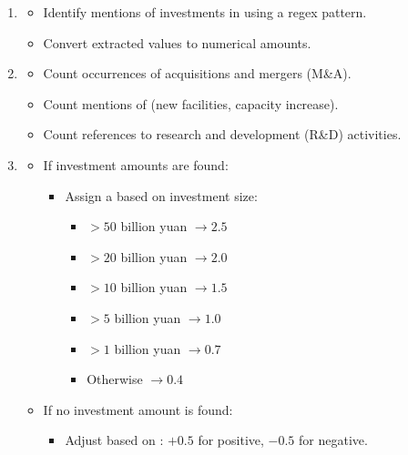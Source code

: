 \documentclass[3p,times,procedia]{elsarticle}
\begin{document}
\begin{enumerate}
    \item {}
    \begin{itemize}
        \item Identify mentions of investments in  using a regex pattern.
        \item Convert extracted values to numerical amounts.
    \end{itemize}

    \item {}
    \begin{itemize}
        \item Count occurrences of acquisitions and mergers (M\&A).
        \item Count mentions of  (new facilities, capacity increase).
        \item Count references to research and development (R\&D) activities.
    \end{itemize}

    \item {}
    \begin{itemize}
        \item If investment amounts are found:
        \begin{itemize}
            \item Assign a  based on investment size:
            \begin{itemize}
                \item $> 50$ billion yuan $\rightarrow 2.5$
                \item $> 20$ billion yuan $\rightarrow 2.0$
                \item $> 10$ billion yuan $\rightarrow 1.5$
                \item $> 5$ billion yuan $\rightarrow 1.0$
                \item $> 1$ billion yuan $\rightarrow 0.7$
                \item Otherwise $\rightarrow 0.4$
            \end{itemize}
        \end{itemize}
        \item If no investment amount is found:
        \begin{itemize}
            \item Adjust based on : $+0.5$ for positive, $-0.5$ for negative.
        \end{itemize}
    \end{itemize}


\end{enumerate}
\end{document}

